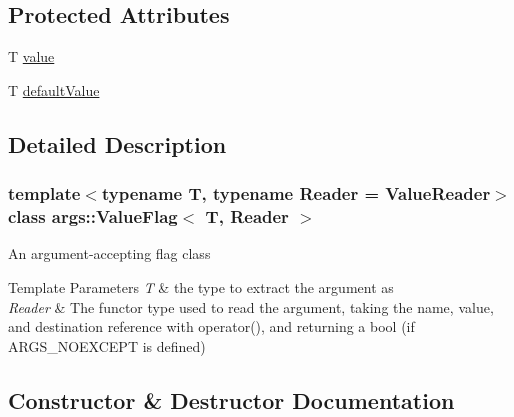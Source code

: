\subsection*{Protected Attributes}
\begin{DoxyCompactItemize}
\item 
T \hyperlink{classargs_1_1_value_flag_a330854b61d30e5c4023bfc24e22a7652}{value}
\item 
T \hyperlink{classargs_1_1_value_flag_a12282c45cbb677e08b789e860cd4e0f0}{default\+Value}
\end{DoxyCompactItemize}


\subsection{Detailed Description}
\subsubsection*{template$<$typename T, typename Reader = Value\+Reader$>$\newline
class args\+::\+Value\+Flag$<$ T, Reader $>$}

An argument-\/accepting flag class


\begin{DoxyTemplParams}{Template Parameters}
{\em T} & the type to extract the argument as \\
\hline
{\em Reader} & The functor type used to read the argument, taking the name, value, and destination reference with operator(), and returning a bool (if A\+R\+G\+S\+\_\+\+N\+O\+E\+X\+C\+E\+PT is defined) \\
\hline
\end{DoxyTemplParams}


\subsection{Constructor \& Destructor Documentation}
\mbox{\label{classargs_1_1_value_flag_a79508651c81bb6bf648bbad03f0ef2f2}} 

